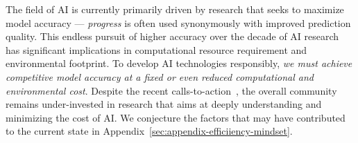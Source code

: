The field of AI is currently primarily driven by research that seeks to maximize model accuracy --- \textit{progress} is often used synonymously with improved prediction quality. This endless pursuit of higher accuracy over the decade of AI research has significant implications in computational resource requirement and environmental footprint.
To develop AI technologies responsibly, \textit{we must achieve competitive model accuracy at a fixed or even reduced computational and environmental cost}. 
Despite the recent calls-to-action~\cite{Strubell:arxiv:2019,Lacoste:arxiv:2019,Henderson:arxiv:2020,Bender:facct:2021,Patterson:arxiv:2021}, the overall community remains under-invested in research that aims at deeply understanding and minimizing the cost of AI. We conjecture the factors that may have contributed to the current state in Appendix~\ref{sec:appendix-efficiiency-mindset}.
